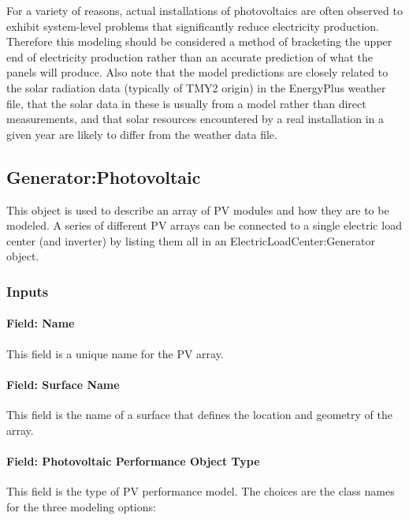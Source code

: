 For a variety of reasons, actual installations of photovoltaics are often observed to exhibit system-level problems that significantly reduce electricity production. Therefore this modeling should be considered a method of bracketing the upper end of electricity production rather than an accurate prediction of what the panels will produce. Also note that the model predictions are closely related to the solar radiation data (typically of TMY2 origin) in the EnergyPlus weather file, that the solar data in these is usually from a model rather than direct measurements, and that solar resources encountered by a real installation in a given year are likely to differ from the weather data file.

\subsection{Generator:Photovoltaic}\label{generatorphotovoltaic-000}

This object is used to describe an array of PV modules and how they are to be modeled. A series of different PV arrays can be connected to a single electric load center (and inverter) by listing them all in an ElectricLoadCenter:Generator object.

\subsubsection{Inputs}\label{inputs-20-000}

\paragraph{Field: Name}\label{field-name-23}

This field is a unique name for the PV array.

\paragraph{Field: Surface Name}\label{field-surface-name-001}

This field is the name of a surface that defines the location and geometry of the array.

\paragraph{Field: Photovoltaic Performance Object Type}\label{field-photovoltaic-performance-object-type}

This field is the type of PV performance model. The choices are the class names for the three modeling options:

